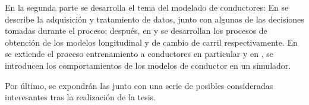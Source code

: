En la segunda parte se desarrolla el tema del modelado de conductores: En  se describe la adquisición y tratamiento de datos, junto con algunas de las decisiones tomadas durante el proceso; después, en  y  se desarrollan los procesos de obtención de los modelos longitudinal y de cambio de carril respectivamente. En  se extiende el proceso entrenamiento a conductores en particular y en , se introducen los comportamientos de los modelos de conductor en un simulador.

Por último, se expondrán las  junto con una serie de posibles  consideradas interesantes tras la realización de la tesis.
